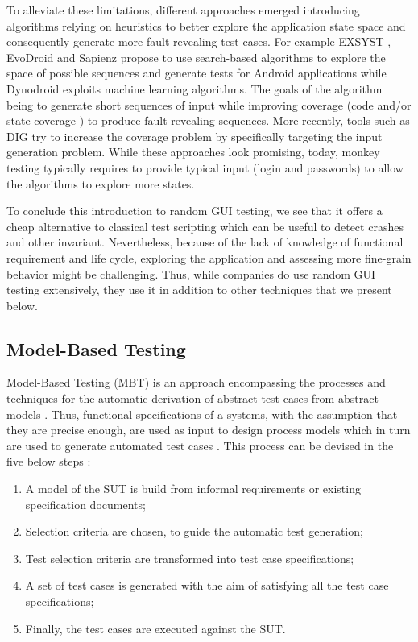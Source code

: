 To alleviate these limitations, different approaches emerged introducing algorithms relying on heuristics to better explore the application state space and consequently generate more fault revealing test cases. For example EXSYST \cite{Gross2012}, EvoDroid \cite{Mahmood2014} and Sapienz \cite{Mao2016} propose to use search-based algorithms to explore the space of possible sequences and generate tests for Android applications while Dynodroid \cite{Machiry2013} exploits machine learning algorithms. The goals of the algorithm being to generate short sequences of input while improving coverage (code \cite{Gross2012} and/or state coverage \cite{Machiry2013}) to produce fault revealing sequences. More recently, tools such as DIG \cite{Biagiola2019} try to increase the coverage problem by specifically targeting the input generation problem. While these approaches look promising, today, monkey testing typically requires to provide typical input (\eg login and passwords) to allow the algorithms to explore more states.

To conclude this introduction to random GUI testing, we see that it offers a cheap alternative to classical test scripting which can be useful to detect crashes and other invariant. Nevertheless, because of the lack of knowledge of functional requirement and life cycle, exploring the application and assessing more fine-grain behavior might be challenging. Thus, while companies do use random GUI testing extensively, they use it in addition to other techniques that we present below.

\subsection{Model-Based Testing}
\label{sec:introduction-model-based-testing}

Model-Based Testing (MBT) is an approach encompassing the processes and techniques for the automatic derivation of abstract test cases from abstract models \cite{Utting2012}. Thus, functional specifications of a systems, with the assumption that they are precise enough, are used as input to design process models which in turn are used to generate automated test cases \cite{Gupta2011}. This process can be devised in the five below steps \cite{Utting2012}:

\begin{enumerate}
    \item A model of the SUT is build from informal requirements or existing specification documents;
    \item Selection criteria are chosen, to guide the automatic test generation;
    \item Test selection criteria are transformed into test case specifications;
    \item A set of test cases is generated with the aim of satisfying all the test case specifications;
    \item Finally, the test cases are executed against the SUT.
\end{enumerate}

